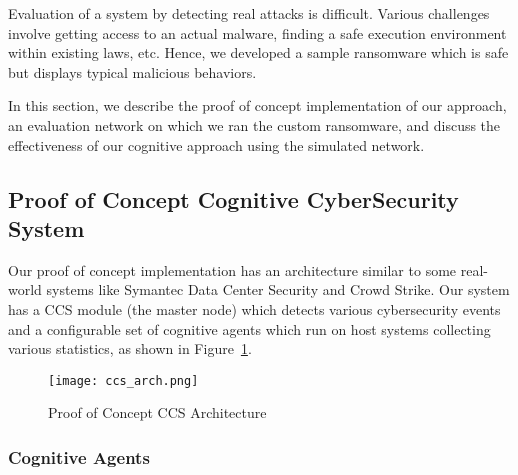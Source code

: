 \label{sec:Evaluation}
Evaluation of a system by detecting real attacks is difficult. Various challenges involve getting access to an actual malware, finding a safe execution environment within existing laws, etc. Hence, we developed a sample ransomware which is safe but displays typical malicious behaviors.

In this section, we describe the proof of concept implementation of our approach, an evaluation network on which we ran the custom ransomware, and discuss the effectiveness of our cognitive approach using the simulated network. 

\subsection{Proof of Concept Cognitive CyberSecurity System}

Our proof of concept implementation has an architecture similar to some real-world systems like Symantec Data Center Security and Crowd Strike. Our system has a CCS module (the master node) which detects various cybersecurity events and a configurable set of cognitive agents which run on host systems collecting various statistics, as shown in Figure~\ref{fig:ccs_arch}. 

\begin{figure}	
	\texttt{[image: ccs\_arch.png]}
	\caption{Proof of Concept CCS Architecture}	
	\label{fig:ccs_arch}
\end{figure}

\subsubsection{Cognitive Agents}
\label{sec:CognitiveAgents}

